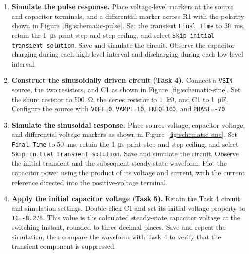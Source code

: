 \documentclass[12pt,a4paper]{article}
\begin{document}
\begin{enumerate}[label=\arabic*., leftmargin=2.5em, itemsep=6pt]
		\item \textbf{Simulate the pulse response.}
		Place voltage-level markers at the source and capacitor
		terminals, and a differential marker across R1 with the
		polarity shown in Figure~\ref{fig:schematic-pulse}.
		Set the transient \texttt{Final Time} to
		\SI{30}{\milli\second}, retain the \SI{1}{\micro\second}
		print step and step ceiling, and select
		\texttt{Skip initial transient solution}.  Save and simulate
		the circuit.  Observe the capacitor charging during each
		high-level interval and discharging during each low-level
		interval.
		
		\item \textbf{Construct the sinusoidally driven circuit (Task 4).}
		Connect a \texttt{VSIN} source, the two resistors, and C1 as
		shown in Figure~\ref{fig:schematic-sine}.  Set the shunt
		resistor to \SI{500}{\ohm}, the series resistor to
		\SI{1}{\kilo\ohm}, and C1 to \SI{1}{\micro\farad}.
		Configure the source with \texttt{VOFF=0},
		\texttt{VAMPL=10}, \texttt{FREQ=100}, and
		\texttt{PHASE=-70}.
		
		\item \textbf{Simulate the sinusoidal response.}
		Place source-voltage, capacitor-voltage, and differential
		voltage markers as shown in Figure~\ref{fig:schematic-sine}.
		Set \texttt{Final Time} to \SI{50}{\milli\second}, retain
		the \SI{1}{\micro\second} print step and step ceiling, and
		select \texttt{Skip initial transient solution}.
		Save and simulate the circuit.  Observe the initial transient
		and the subsequent steady-state waveform.  Plot the capacitor
		power using the product of its voltage and current, with the
		current reference directed into the positive-voltage terminal.
		
		\item \textbf{Apply the initial capacitor voltage (Task 5).}
		Retain the Task 4 circuit and simulation settings.
		Double-click C1 and set its initial-voltage property to
		\texttt{IC=-8.278}.  This value is the calculated
		steady-state capacitor voltage at the switching instant,
		rounded to three decimal places.  Save and repeat the
		simulation, then compare the waveform with Task 4 to verify
		that the transient component is suppressed.
		

\end{enumerate}
\end{document}

